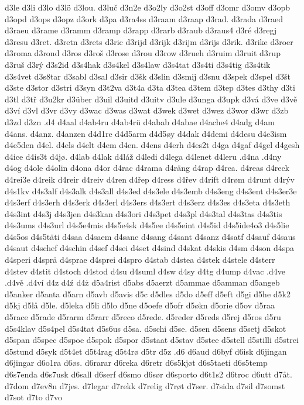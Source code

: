 d3le
d3li
d3lo
d3lö
d3lou.
d3luč
d3n2e
d3o2ly
d3o2st
d3off
d3omr
d3omv
d3opb
d3opd
d3ops
d3opz
d3ork
d3pa
d3ra4ss
d3raam
d3raap
d3rad.
d3rada
d3raed
d3raeu
d3rame
d3ramm
d3ramp
d3rapp
d3rarb
d3raub
d3raus4
d3ré
d3regj
d3resu
d3ret.
d3retn
d3rets
d3ric
d3rijd
d3rijk
d3rijm
d3rijs
d3rik.
d3rike
d3roer
d3roma
d3rond
d3ros
d3roš
d3rose
d3rou
d3row
d3rueh
d3ruim
d3ruit
d3rup
d3ruš
d3rý
d3s2id
d3s4hak
d3s4kel
d3s4law
d3s4tat
d3s4ti
d3s4tig
d3s4tik
d3s4vet
d3s8tar
d3sabl
d3sal
d3sir
d3šk
d3slin
d3smij
d3snu
d3spek
d3spel
d3št
d3ste
d3stor
d3stri
d3syn
d3t2va
d3t4a
d3ta
d3tea
d3tem
d3tep
d3tes
d3thy
d3ti
d3tl
d3tř
d3u2kr
d3über
d3uil
d3uitd
d3uitv
d3ule
d3unga
d3upk
d3vá
d3ve
d3vě
d3ví
d3vl
d3vr
d3vy
d3wac
d3was
d3wat
d3wek
d3wet
d3wez
d3wor
d3wr
d3zb
d3zd
d3zn
.d4
d4aal
d4ab4ru
d4ab4rü
d4abab
d4abae
d4ache4
d4adg
d4am
d4ans.
d4anz.
d4anzen
d4d1re
d4d5arm
d4d5øy
d4dak
d4demi
d4desu
d4e3ism
d4e5den
d4el.
d4els
d4elt
d4em
d4en.
d4ens
d4erh
d4es2t
d4ga
d4gaf
d4gel
d4gesh
d4ice
d4is3t
d4jø.
d4lab
d4lak
d4láž
d4ledi
d4lega
d4lenet
d4leru
.d4na
.d4ny
d4og
d4ole
d4olin
d4ona
d4or
d4rac
d4rama
d4räng
d4rap
d4rea.
d4reas
d4reck
d4rei3e
d4reik
d4reir
d4reiv
d4ren
d4řep
d4ress
d4řev
d4rift
d4røm
d4runt
d4rýv
d4s1kv
d4s3alf
d4s3alk
d4s3all
d4s3ed
d4s3ele
d4s3emb
d4s3eng
d4s3ent
d4s3er3e
d4s3erf
d4s3erh
d4s3erk
d4s3erl
d4s3ers
d4s3ert
d4s3erz
d4s3es
d4s3eta
d4s3eth
d4s3int
d4s3j
d4s3jen
d4s3kan
d4s3ori
d4s3pet
d4s3pl
d4s3tal
d4s3tas
d4s3tis
d4s3ums
d4s3url
d4s5e4mis
d4s5e4sk
d4s5ee
d4s5eint
d4s5id
d4s5ide4o3
d4s5lie
d4s5os
d4s5täti
d4saa
d4saem
d4sane
d4sang
d4sant
d4sanz
d4satf
d4sauf
d4saus
d4saut
d4schef
d4schin
d4sef
d4sei
d4set
d4sind
d4skat
d4skis
d4sm
d4son
d4spa
d4speri
d4sprä
d4sprae
d4sprei
d4spro
d4stab
d4stea
d4stek
d4stele
d4sterr
d4stev
d4stit
d4stoch
d4stod
d4su
d4suml
d4sw
d4sy
d4tg
d4ump
d4vac
.d4ve
.d4vě
.d4ví
d4z
d4ź
d4ż
d5a4rist
d5abs
d5aerzt
d5ammae
d5amman
d5angeb
d5anker
d5anta
d5arn
d5avb
d5avis
d5c
d5dles
d5do
d5eff
d5eft
d5gi
d5he
d5k2
d5kj
d5lå
d5le.
d5leka
d5li
d5lo
d5ne
d5oefe
d5ofr
d5økn
d5orie
d5ov
d5raa
d5race
d5rade
d5rarm
d5rarr
d5reco
d5rede.
d5reder
d5reds
d5rej
d5ros
d5ru
d5s4klav
d5s4pel
d5s4tat
d5s6us
d5sa.
d5schi
d5se.
d5sen
d5sens
d5setj
d5skot
d5span
d5spec
d5spoe
d5spok
d5spor
d5staat
d5stav
d5stee
d5stell
d5stilli
d5strei
d5stund
d5syk
d5t4et
d5t4rag
d5t4rø
d5tr
d5z
.d6
d6aud
d6byf
d6isk
d6jingan
d6jingar
d6o1ra
d6øs.
d6rarar
d6reka
d6retr
d6s5kjøt
d6s5taeti
d6s5temp
d6s7enda
d6s7usk
d6sall
d6serf
d6smo
d6sør
d6sporto
d6t1s2
d6troc
d6utt
d7åt.
d7dom
d7ev8n
d7jes.
d7legar
d7rekk
d7relig
d7røt
d7ser.
d7sida
d7sil
d7somst
d7sot
d7to
d7vo
